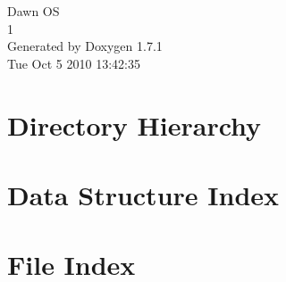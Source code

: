 \documentclass[a4paper]{book}
\begin{document}
\hypersetup{pageanchor=false}
\begin{titlepage}
\vspace*{7cm}
\begin{center}
{\Large Dawn OS \\[1ex]\large 1 }\\
\vspace*{1cm}
{\large Generated by Doxygen 1.7.1}\\
\vspace*{0.5cm}
{\small Tue Oct 5 2010 13:42:35}\\
\end{center}
\end{titlepage}
\clearemptydoublepage
{}
\tableofcontents
\clearemptydoublepage
{}
\hypersetup{pageanchor=true}
\chapter{Directory Hierarchy}

\chapter{Data Structure Index}

\chapter{File Index}

\end{document}
